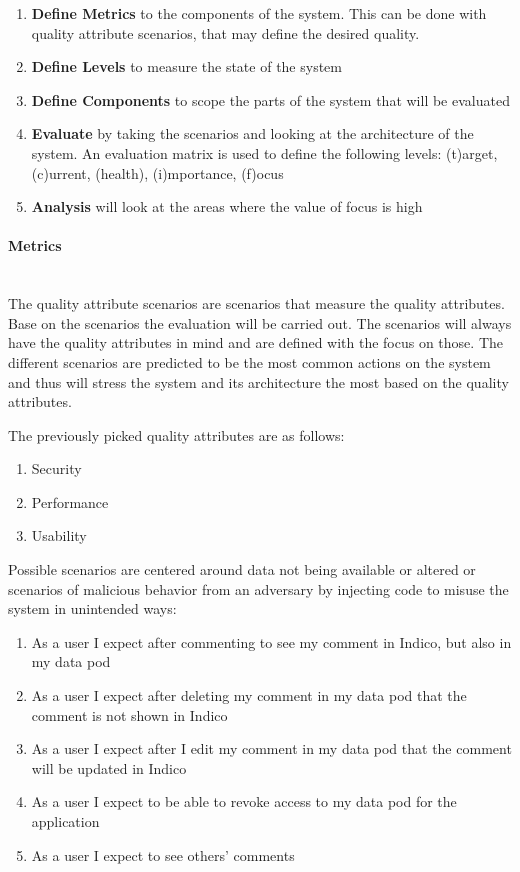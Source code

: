 \begin{enumerate}
    \item \textbf{Define Metrics} to the components of the system. This can be done with quality attribute scenarios, that may define the desired quality.
    \item \textbf{Define Levels} to measure the state of the system
    \item \textbf{Define Components} to scope the parts of the system that will be evaluated
    \item \textbf{Evaluate} by taking the scenarios and looking at the architecture of the system. An evaluation matrix is used to define the following levels: (t)arget, (c)urrent, (health), (i)mportance, (f)ocus
    \item \textbf{Analysis} will look at the areas where the value of focus is high
\end{enumerate}

\vspace{0.5cm}
\paragraph{Metrics}\mbox{}\\

The quality attribute scenarios are scenarios that measure the quality attributes. Base on the scenarios the evaluation will be carried out. The scenarios will always have the quality attributes in mind and are defined with the focus on those. The different scenarios are predicted to be the most common actions on the system and thus will stress the system and its architecture the most based on the quality attributes.

The previously picked quality attributes are as follows:

\begin{enumerate}
    \item Security
    \item Performance
    \item Usability
\end{enumerate}

Possible scenarios are centered around data not being available or altered or scenarios of malicious behavior from an adversary by injecting code to misuse the system in unintended ways:

\begin{enumerate}
    \item As a user I expect after commenting to see my comment in Indico, but also in my data pod
    \item As a user I expect after deleting my comment in my data pod that the comment is not shown in Indico
    \item As a user I expect after I edit my comment in my data pod that the comment will be updated in Indico
    \item As a user I expect to be able to revoke access to my data pod for the application
    \item As a user I expect to see others' comments
\end{enumerate}


